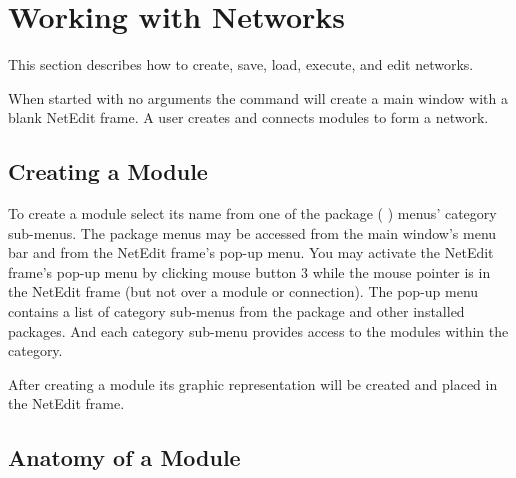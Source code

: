 %
%
%
%
%

%

\section{Working with Networks}
\label{sec:workwithnets}

This section describes how to create, save, load, execute, and edit
networks.

When started with no arguments the  command will create a
main window with a blank NetEdit frame.  A user creates and
connects modules to form a network.


\subsection{Creating a Module}
\label{sec:creatingmodules}

To create a module select its name from one of the package (\eg{} \sr)
menus' category sub-menus.  The package menus may be accessed from the
main window's menu bar and from the NetEdit frame's pop-up menu. You
may activate the NetEdit frame's pop-up menu by clicking mouse button
3 while the mouse pointer is in the NetEdit frame (but not over a
module or connection).  The pop-up menu contains a list of category
sub-menus from the \sr{} package and other installed packages.  And
each category sub-menu provides access to the modules within the
category.

After creating a module its graphic representation will be created and
placed in the NetEdit frame.

\subsection{Anatomy of a Module}
\label{sec:modanatomy}

